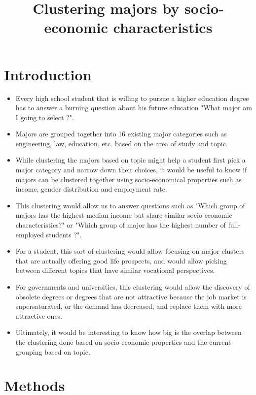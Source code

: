 \documentclass[11pt,a4paper]{article}
\date{}
\title{Clustering majors by socio-economic characteristics}
\begin{document}
\newpage
\maketitle

\section*{Introduction}

\begin{itemize}
    \item Every high school student that is willing to pursue a higher education degree has to answer a burning question about his future education "What major am I going to select ?".
    \item Majors are grouped together into 16 existing major categories such as engineering, law, education, etc. based on the area of study and topic.
    \item While clustering the majors based on topic might help a student first pick a major category and narrow down their choices, it would be useful to know if majors can be clustered together using socio-economical properties such as income, gender distribution and employment rate.
    \item This clustering  would allow us to answer questions such as "Which group of majors has the highest median income but share similar socio-economic characteristics?" or "Which group of major has the highest number of full-employed students ?".
    \item For a student, this sort of clustering would allow focusing on major clusters that are actually offering good life prospects, and would allow picking between different topics that have similar vocational perspectives.
    \item For governments and universities, this clustering would allow the discovery of obsolete degrees or degrees that are not attractive because the job market is supersaturated, or the demand has decreased, and replace them with more attractive ones.
    \item Ultimately, it would be interesting to know how big is the overlap between the clustering done based on socio-economic properties and the current grouping based on topic. 
\end{itemize}

\section*{Methods}
\end{document}
